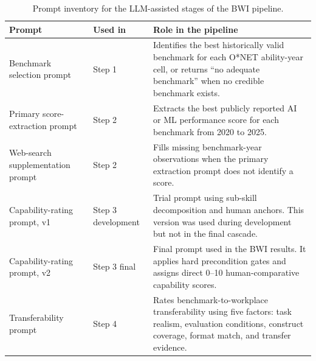 \begin{table}[htbp]\centering
\caption{Prompt inventory for the LLM-assisted stages of the BWI pipeline.}\label{tab:prompts}
\begin{tabular}{llp{8cm}}\toprule
Prompt & Used in & Role in the pipeline \\ \midrule
Benchmark selection prompt & Step 1 & Identifies the best historically valid benchmark for each O*NET ability-year cell, or returns ``no adequate benchmark'' when no credible benchmark exists. \\
Primary score-extraction prompt & Step 2 & Extracts the best publicly reported AI or ML performance score for each benchmark from 2020 to 2025. \\
Web-search supplementation prompt & Step 2 & Fills missing benchmark-year observations when the primary extraction prompt does not identify a score. \\
Capability-rating prompt, v1 & Step 3 development & Trial prompt using sub-skill decomposition and human anchors. This version was used during development but not in the final cascade. \\
Capability-rating prompt, v2 & Step 3 final & Final prompt used in the BWI results. It applies hard precondition gates and assigns direct 0--10 human-comparative capability scores. \\
Transferability prompt & Step 4 & Rates benchmark-to-workplace transferability using five factors: task realism, evaluation conditions, construct coverage, format match, and transfer evidence. \\
\bottomrule\end{tabular}\end{table}
